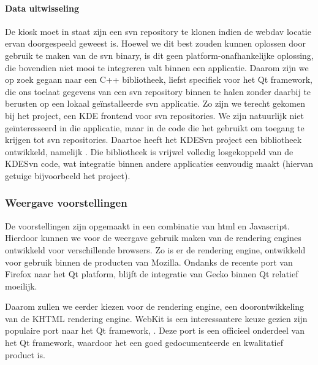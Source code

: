 \paragraph{Data uitwisseling} De kiosk moet in staat zijn een \ac{svn} repository te klonen indien de \ac{webdav} locatie ervan doorgespeeld geweest is. Hoewel we dit best zouden kunnen oplossen door gebruik te maken van de \ac{svn} binary, is dit geen platform-onafhankelijke oplossing, die bovendien niet mooi te integreren valt binnen een applicatie. Daarom zijn we op zoek gegaan naar een C++ bibliotheek, liefst specifiek voor het Qt framework, die ons toelaat gegevens van een \ac{svn} repository binnen te halen zonder daarbij te berusten op een lokaal geïnstalleerde \ac{svn} applicatie. Zo zijn we terecht gekomen bij het  project, een KDE frontend voor \ac{svn} repositories. We zijn natuurlijk niet geïnteresseerd in die applicatie, maar in de code die het gebruikt om toegang te krijgen tot \ac{svn} repositories. Daartoe heeft het KDESvn project een bibliotheek ontwikkeld, namelijk . Die bibliotheek is vrijwel volledig losgekoppeld van de KDESvn code, wat integratie binnen andere applicaties eenvoudig maakt (hiervan getuige bijvoorbeeld het  project).

\subsubsection{Weergave voorstellingen}

De voorstellingen zijn opgemaakt in een combinatie van \ac{html} en Javascript. Hierdoor kunnen we voor de weergave gebruik maken van de rendering engines ontwikkeld voor verschillende browsers. Zo is er de  rendering engine, ontwikkeld voor gebruik binnen de producten van Mozilla. Ondanks de recente port van Firefox naar het Qt platform, blijft de integratie van Gecko binnen Qt relatief moeilijk.

Daarom zullen we eerder kiezen voor de  rendering engine, een doorontwikkeling van de KHTML rendering engine. WebKit is een interessantere keuze gezien zijn populaire port naar het Qt framework, . Deze port is een officieel onderdeel van het Qt framework, waardoor het een goed gedocumenteerde en kwalitatief product is.

